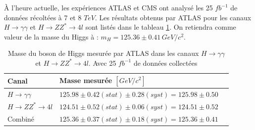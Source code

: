   \medskip
  
  \`A l'heure actuelle, les exp\'eriences ATLAS et CMS ont analys\'e les 25 $fb^{-1}$ de donn\'ees r\'ecolt\'ees \`a 7 et 8 $TeV$. Les r\'esultats obtenus par ATLAS \cite{Aad:2014aba} pour les canaux $H \rightarrow \gamma \gamma$ et $H \rightarrow Z Z^*  \rightarrow 4 l$ sont list\'es dans le tableau \ref{ATLAS_results_2014}. On retiendra comme valeur de la masse du Higgs \`a : $m_H = 125.36 \pm 0.41 \, GeV/c^2$.
  
  \begin{table}{
  \begin{center}
   \begin{tabular}{|l|l|l|} \hline
     Canal & {Masse mesur\'ee $[GeV/c^2]$} \\ \hline
     $H \rightarrow \gamma \gamma$ & $125.98 \pm 0.42 (stat) \pm 0.28 (syst) = 125.98 \pm 0.50$ \\ \hline
     $H \rightarrow Z Z^*  \rightarrow 4 l$ & $124.51 \pm 0.52 (stat) \pm 0.06 (syst) = 124.51 \pm 0.52$\\ \hline
     Combin\'e & $125.36 \pm 0.37 (stat) \pm 0.18 (syst) = 125.36 \pm 0.41$ \\ \hline
   \end{tabular}
   \caption{Masse du boson de Higgs mesur\'ee par ATLAS dans les canaux $H \rightarrow \gamma \gamma$ et $H \rightarrow Z Z^*  \rightarrow 4 l$. Avec 25 $fb^{-1}$ de donn\'ees collect\'ees}
   \label{ATLAS_results_2014}
  \end{center}}
 \end{table}
 
